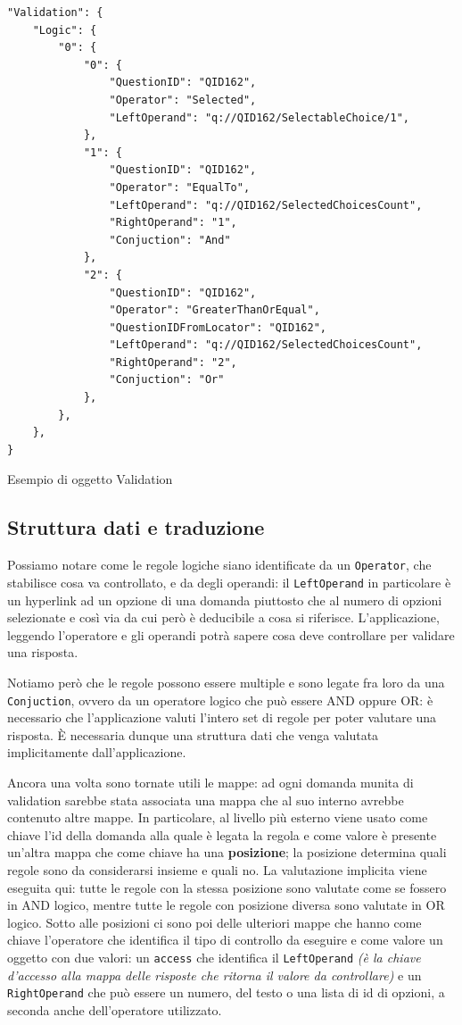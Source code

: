 \begin{json}
\begin{verbatim}
"Validation": {
    "Logic": {
        "0": {
            "0": {
                "QuestionID": "QID162",
                "Operator": "Selected",
                "LeftOperand": "q://QID162/SelectableChoice/1",
            },
            "1": {
                "QuestionID": "QID162",
                "Operator": "EqualTo",
                "LeftOperand": "q://QID162/SelectedChoicesCount",
                "RightOperand": "1",
                "Conjuction": "And"
            },
            "2": {
                "QuestionID": "QID162",
                "Operator": "GreaterThanOrEqual",
                "QuestionIDFromLocator": "QID162",
                "LeftOperand": "q://QID162/SelectedChoicesCount",
                "RightOperand": "2",
                "Conjuction": "Or"
            },
        },
    },
}
\end{verbatim}
\caption{Esempio di oggetto Validation}
\label{json:validation}
\end{json}

\subsection{Struttura dati e traduzione}
Possiamo notare come le regole logiche siano identificate da un \texttt{Operator}, che stabilisce cosa va controllato, e da degli operandi: il \texttt{LeftOperand} in particolare è un hyperlink ad un opzione di una domanda piuttosto che al numero di opzioni selezionate e così via da cui però è deducibile a cosa si riferisce. L'applicazione, leggendo l'operatore e gli operandi potrà sapere cosa deve controllare per validare una risposta.

Notiamo però che le regole possono essere multiple e sono legate fra loro da una \texttt{Conjuction}, ovvero da un operatore logico che può essere AND oppure OR: è necessario che l'applicazione valuti l'intero set di regole per poter valutare una risposta. È necessaria dunque una struttura dati che venga valutata implicitamente dall'applicazione.

Ancora una volta sono tornate utili le mappe: ad ogni domanda munita di validation sarebbe stata associata una mappa che al suo interno avrebbe contenuto altre mappe. In particolare, al livello più esterno viene usato come chiave l'id della domanda alla quale è legata la regola e come valore è presente un'altra mappa che come chiave ha una \textbf{posizione}; la posizione determina quali regole sono da considerarsi insieme e quali no. La valutazione implicita viene eseguita qui: tutte le regole con la stessa posizione sono valutate come se fossero in AND logico, mentre tutte le regole con posizione diversa sono valutate in OR logico.
Sotto alle posizioni ci sono poi delle ulteriori mappe che hanno come chiave l'operatore che identifica il tipo di controllo da eseguire e come valore un oggetto con due valori: un \texttt{access} che identifica il \texttt{LeftOperand} \textit{(è la chiave d'accesso alla mappa delle risposte che ritorna il valore da controllare)} e un \texttt{RightOperand} che può essere un numero, del testo o una lista di id di opzioni, a seconda anche dell'operatore utilizzato.

